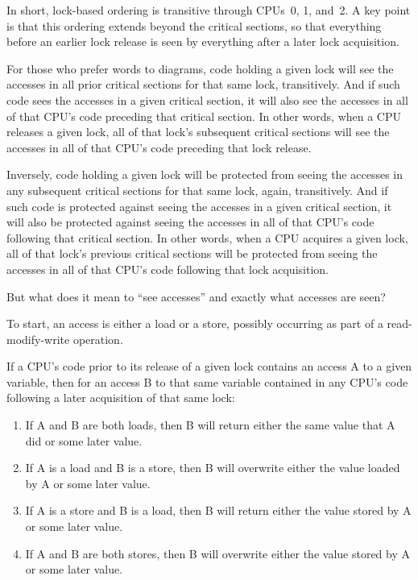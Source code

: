 In short, lock-based ordering is transitive through CPUs~0, 1, and~2.
A key point is that this ordering extends beyond the critical sections,
so that everything before an earlier lock release is seen by everything
after a later lock acquisition.

For those who prefer words to diagrams, code holding a given lock will
see the accesses in all prior critical sections for that same lock,
transitively.
And if such code sees the accesses in a given critical section, it will
also see the accesses in all of that CPU's code preceding
that critical section.
In other words, when a CPU releases a given lock, all
of that lock's subsequent critical sections will see the accesses in
all of that CPU's code preceding that lock release.

Inversely, code holding a given lock will be protected from seeing the
accesses in any subsequent critical sections for that same lock, again,
transitively.
And if such code is protected against seeing the accesses in a given
critical section, it will also be protected against seeing the accesses
in all of that CPU's code following that critical section.
In other words, when a CPU acquires a given lock, all of
that lock's previous critical sections will be protected from seeing
the accesses in all of that CPU's code following that lock
acquisition.

But what does it mean to ``see accesses'' and exactly what accesses
are seen?

To start, an access is either a load or a store, possibly occurring as part
of a read-modify-write operation.

If a CPU's code prior to its release of a given lock contains
an access A to a given variable, then for an access B to that same variable
contained in any CPU's code following a later acquisition
of that same lock:

\begin{enumerate}
\item	If A and B are both loads, then B will return either the same
	value that A did or some later value.
\item	If A is a load and B is a store, then B will overwrite either the
	value loaded by A or some later value.
\item	If A is a store and B is a load, then B will return either the
	value stored by A or some later value.
\item	If A and B are both stores, then B will overwrite either the value
	stored by A or some later value.
\end{enumerate}

